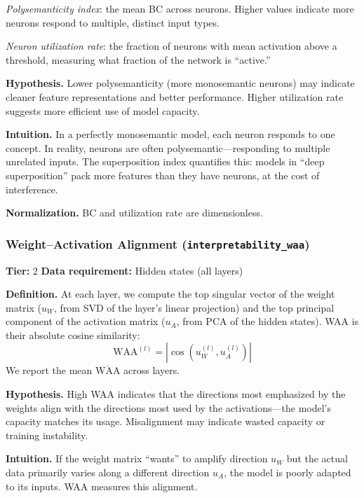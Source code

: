 \documentclass[preprint]{neurips_2025}
\begin{document}
\emph{Polysemanticity index}: the mean BC across neurons. Higher values indicate more neurons respond to multiple, distinct input types.

\emph{Neuron utilization rate}: the fraction of neurons with mean activation above a threshold, measuring what fraction of the network is ``active.''

\textbf{Hypothesis.}
Lower polysemanticity (more monosemantic neurons) may indicate cleaner feature representations and better performance. Higher utilization rate suggests more efficient use of model capacity.

\textbf{Intuition.}
In a perfectly monosemantic model, each neuron responds to one concept. In reality, neurons are often polysemantic---responding to multiple unrelated inputs. The superposition index quantifies this: models in ``deep superposition'' pack more features than they have neurons, at the cost of interference.

\textbf{Normalization.} BC and utilization rate are dimensionless.

\subsubsection{Weight--Activation Alignment (\texttt{interpretability\_waa})}
\label{app:waa}

\textbf{Tier:} 2 \quad \textbf{Data requirement:} Hidden states (all layers)

\textbf{Definition.}
At each layer, we compute the top singular vector of the weight matrix ($u_W$, from SVD of the layer's linear projection) and the top principal component of the activation matrix ($u_A$, from PCA of the hidden states). WAA is their absolute cosine similarity:
\begin{equation}
  \text{WAA}^{(l)} = |\cos(u_W^{(l)}, u_A^{(l)})|
\end{equation}
We report the mean $\overline{\text{WAA}}$ across layers.

\textbf{Hypothesis.}
High WAA indicates that the directions most emphasized by the weights align with the directions most used by the activations---the model's capacity matches its usage. Misalignment may indicate wasted capacity or training instability.

\textbf{Intuition.}
If the weight matrix ``wants'' to amplify direction $u_W$ but the actual data primarily varies along a different direction $u_A$, the model is poorly adapted to its inputs. WAA measures this alignment.
\end{document}
